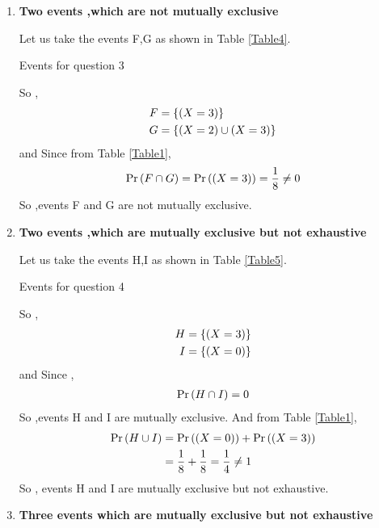 \documentclass[journal,12pt,twocolumn]{IEEEtran}
\begin{document}
\begin{enumerate}[label=(\roman*)]
    \item \textbf{Two events ,which are not mutually exclusive}
    
    Let us take the events F,G as shown in Table \ref{Table4}.
    \begin{table}[ht!]
        
        \caption{Events for question 3}
        \label{Table4}
    \end{table}
    So ,
    \begin{align}
        F &= \left\{(X=3)\right\} \\
	    G &=  \left\{(X=2) \cup (X=3)\right\}
    \end{align}
    and Since from Table \ref{Table1},
    \begin{align}
        \Pr\left(F \cap G\right) = \Pr\left((X=3)\right) = \dfrac{1}{8} \neq 0
    \end{align}
    So ,events F and G are not mutually exclusive.
  
    \item \textbf{Two events ,which are mutually exclusive but not exhaustive}
    
    Let us take the events H,I as shown in Table \ref{Table5}.
    \begin{table}[ht!]
        
        \caption{Events for question 4}
        \label{Table5}
    \end{table}
    So ,
    \begin{align}
        H &= \left\{ (X=3) \right\} \\
        I &= \left\{ (X=0) \right\}
    \end{align}
    and Since ,
    \begin{align}
        \Pr\left(H \cap I\right) = 0
    \end{align}
    So ,events H and I are mutually exclusive. And from Table \ref{Table1},
    \begin{align}
        \Pr\left(H \cup I\right) &= \Pr\left((X=0)\right) + \Pr\left((X=3)\right) \\
                      &= \dfrac{1}{8} + \dfrac{1}{8} = \dfrac{1}{4} \neq 1
    \end{align}
    So , events H and I are mutually exclusive but not exhaustive.
    
    \item \textbf{Three events which are mutually exclusive but not exhaustive}
    

\end{enumerate}
\end{document}
